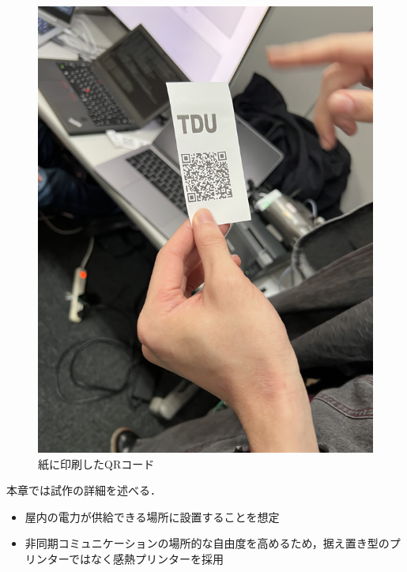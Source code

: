 \documentclass[submit,techrep,noauthor]{ipsj}
\begin{document}
\begin{figure}[tb]
\includegraphics[scale=0.35,bb= 0 0 2000 1000]{image/paper.png}
\caption{紙に印刷したQRコード}
\label{fig:paper}
\end{figure}

本章では試作の詳細を述べる．
\begin{itemize}
    \item 屋内の電力が供給できる場所に設置することを想定
    \item 非同期コミュニケーションの場所的な自由度を高めるため，据え置き型のプリンターではなく感熱プリンターを採用
\end{itemize}
\end{document}
